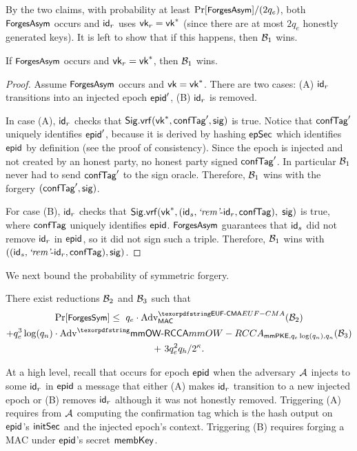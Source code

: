 By the two claims, with probability at least $\Pr[\forgesa]/(2q_e)$, both $\forgesa$ occurs and $\id_r$ uses $\ersvk_r=\ersvk^*$ (since there are at most $2q_e$ honestly generated keys). It is left to show that if this happens, then $\Bdv[1]$ wins.
\begin{claim}
  If $\forgesa$ occurs and $\ersvk_r=\ersvk^*$, then $\Bdv[1]$ wins.
\end{claim}
\begin{proof}
  Assume $\forgesa$ occurs and $\ersvk=\ersvk^*$. There are two cases: (A) $\id_r$ transitions into an injected epoch $\hgnodeid'$, (B) $\id_r$ is removed.

  In case (A), $\id_r$ checks that $\sigvrf(\ersvk^*, \confTag', \sig)$ is true. Notice that $\confTag'$ uniquely identifies $\hgnodeid'$, because it is derived by hashing $\epochSecret$ which identifies $\hgnodeid$ by definition (see the proof of \saik consistency). Since the epoch is injected and not created by an honest party, no honest party signed $\confTag'$. In particular $\Bdv[1]$ never had to send $\confTag'$ to the sign oracle. Therefore, $\Bdv[1]$ wins with the forgery $(\confTag', \sig)$.

  For case (B), $\id_r$ checks that $\sigvrf(\ersvk^*, (\id_s, \hglr\md\id_r, \confTag),$ $ \sig)$ is true, where $\confTag$ uniquely identifies $\hgnodeid$. $\forgesa$ guarantees that $\id_s$ did not remove $\id_r$ in $\hgnodeid$, so it did not sign such a triple. Therefore, $\Bdv[1]$ wins with $((\id_s, \hglr\md\id_r, \confTag), \sig)$.
\end{proof}

\newcommand{\hybridThreeN}{3$^*$\xspace}
\newcommand{\forgessN}{\forgess\xmath{^*}\xspace}
We next bound the probability of symmetric forgery.
\begin{lemma}
There exist reductions $\Bdv[2]$ and $\Bdv[3]$ such that
\begin{multline*}
    \Pr[\forgess] \leq \  q_e\cdot \textnormal{Adv}^{\ufcma}_\mac(\Bdv[2]) \\+ q_e^3\log(q_n)\cdot \textnormal{Adv}^\mmowrcca_{\mmPKE,q_e\log(q_n),q_n}(\Bdv[3])\\+\  3q_e^2q_h/2^\kappa .
\end{multline*}
\end{lemma}

At a high level, recall that \forgess occurs for epoch $\hgnodeid$ when the adversary $\Adv$ injects to some $\id_r$ in $\hgnodeid$ a message that either (A) makes $\id_r$ transition to a new injected epoch or (B) removes $\id_r$ although it was not honestly removed. Triggering (A) requires from $\Adv$ computing the confirmation tag which is the hash output on $\hgnodeid$'s $\initSecret$ and the injected epoch's context. Triggering (B) requires forging a MAC under $\hgnodeid$'s secret $\membershipKey$.

